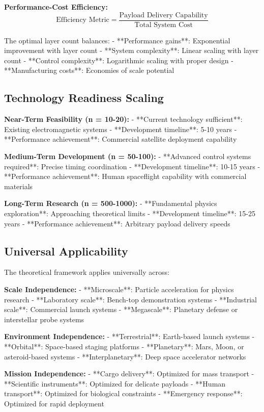 \documentclass[12pt,a4paper]{article}
\begin{document}
\textbf{Performance-Cost Efficiency:}
\begin{equation}
\text{Efficiency Metric} = \frac{\text{Payload Delivery Capability}}{\text{Total System Cost}}
\end{equation}

The optimal layer count balances:
- **Performance gains**: Exponential improvement with layer count
- **System complexity**: Linear scaling with layer count  
- **Control complexity**: Logarithmic scaling with proper design
- **Manufacturing costs**: Economies of scale potential

\subsection{Technology Readiness Scaling}

\textbf{Near-Term Feasibility (n = 10-20):}
- **Current technology sufficient**: Existing electromagnetic systems
- **Development timeline**: 5-10 years
- **Performance achievement**: Commercial satellite deployment capability

\textbf{Medium-Term Development (n = 50-100):}
- **Advanced control systems required**: Precise timing coordination
- **Development timeline**: 10-15 years
- **Performance achievement**: Human spaceflight capability with commercial materials

\textbf{Long-Term Research (n = 500-1000):}
- **Fundamental physics exploration**: Approaching theoretical limits
- **Development timeline**: 15-25 years
- **Performance achievement**: Arbitrary payload delivery speeds

\subsection{Universal Applicability}

The theoretical framework applies universally across:

\textbf{Scale Independence:}
- **Microscale**: Particle acceleration for physics research
- **Laboratory scale**: Bench-top demonstration systems
- **Industrial scale**: Commercial launch systems
- **Megascale**: Planetary defense or interstellar probe systems

\textbf{Environment Independence:}
- **Terrestrial**: Earth-based launch systems
- **Orbital**: Space-based staging platforms
- **Planetary**: Mars, Moon, or asteroid-based systems
- **Interplanetary**: Deep space accelerator networks

\textbf{Mission Independence:}
- **Cargo delivery**: Optimized for mass transport
- **Scientific instruments**: Optimized for delicate payloads
- **Human transport**: Optimized for biological constraints
- **Emergency response**: Optimized for rapid deployment
\end{document}

